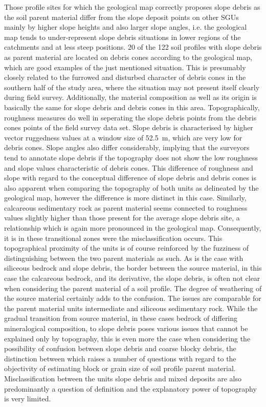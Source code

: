 \documentclass[preprint,12pt,authoryear]{elsarticle}
\begin{document}
Those profile sites for which the geological map correctly proposes slope debris as the soil parent material differ from the slope deposit points on other SGUs mainly by higher slope heights and also larger slope angles, i.e. the geological map tends to under-represent slope debris situations in lower regions of the catchments and at less steep positions. 20 of the 122 soil profiles with slope debris as parent material are located on debris cones according to the geological map, which are good examples of the just mentioned situation. This is presumably closely related to the furrowed and disturbed character of debris cones in the southern half of the study area, where the situation may not present itself clearly during field survey. Additionally, the material composition as well as its origin is basically the same for slope debris and debris cones in this area. Topographically, roughness measures do well in seperating the slope debris points from the debris cones points of the field survey data set. Slope debris  is characterised by higher vector ruggedness values at a window size of 52.5~m, which are very low for debris cones. Slope angles also differ considerably, implying that the surveyors tend to annotate slope debris if the topography does not show the low roughness and slope values characteristic of debris cones. This difference of roughness and slope with regard to the conceptual difference of slope debris and debris cones is also apparent when comparing the topography of both units as delineated by the geological map, however the difference is more distinct in this case. Similarly, calcareous sedimentary rock as parent material seems connected to roughness values slightly higher than those present for the average slope debris site, a relationship which is again more pronounced in the geological map. Consequently, it is in these transitional zones were the misclassification occurs. This topographical proximity of the units is of course  reinforced by the fuzziness of distinguishing between the two parent materials as such. As is the case with siliceous bedrock and slope debris, the border between the  source material, in this case the calcareous bedrock, and its derivative, the slope debris, is often not clear when considering the parent material of a soil profile. The degree of weathering of the source material certainly adds to the confusion. The  issues are comparable for the parent material units intermediate and siliceous sedimentary rock. While the gradual transition from source material, in these cases bedrock of differing mineralogical composition, to slope debris poses various issues that cannot be explained only by topography, this is even more the case when considering the possibility of confusion between slope debris and coarse blocky debris, the distinction between which raises a number of questions with regard to the objectivity of  estimating block or grain size of soil profile parent material. Misclassification between the units slope debris and mixed deposits are also predominantly a question of definition and the explanatory power of topography is very limited.
\end{document}
